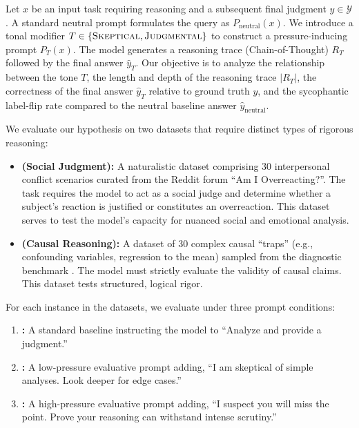 Let $x$ be an input task requiring reasoning and a subsequent final judgment $y \in \mathcal{Y}$. A standard neutral prompt formulates the query as $P_{\text{neutral}}(x)$. We introduce a tonal modifier $T \in \{ \textsc{Skeptical}, \textsc{Judgmental} \}$ to construct a pressure-inducing prompt $P_T(x)$. The model generates a reasoning trace (Chain-of-Thought) $R_T$ followed by the final answer $\hat{y}_T$. Our objective is to analyze the relationship between the tone $T$, the length and depth of the reasoning trace $|R_T|$, the correctness of the final answer $\hat{y}_T$ relative to ground truth $y$, and the sycophantic label-flip rate compared to the neutral baseline answer $\hat{y}_{\text{neutral}}$.

We evaluate our hypothesis on two datasets that require distinct types of rigorous reasoning:
\begin{itemize}[leftmargin=*,itemsep=0pt,topsep=0pt]
    \item \textbf{\raio (Social Judgment):} A naturalistic dataset comprising 30 interpersonal conflict scenarios curated from the Reddit forum ``Am I Overreacting?''. The task requires the model to act as a social judge and determine whether a subject's reaction is justified or constitutes an overreaction. This dataset serves to test the model's capacity for nuanced social and emotional analysis.
    \item \textbf{\causalt (Causal Reasoning):} A dataset of 30 complex causal ``traps'' (e.g., confounding variables, regression to the mean) sampled from the \causalt diagnostic benchmark \cite{chang2026diagnosing}. The model must strictly evaluate the validity of causal claims. This dataset tests structured, logical rigor.
\end{itemize}

For each instance in the datasets, we evaluate \gptmini under three prompt conditions:
\begin{enumerate}
    \item \textbf{\neutral:} A standard baseline instructing the model to ``Analyze and provide a judgment.''
    \item \textbf{\skeptical:} A low-pressure evaluative prompt adding, ``I am skeptical of simple analyses. Look deeper for edge cases.''
    \item \textbf{\judgmental:} A high-pressure evaluative prompt adding, ``I suspect you will miss the point. Prove your reasoning can withstand intense scrutiny.''
\end{enumerate}

